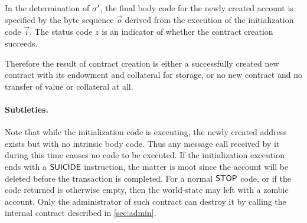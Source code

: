 In the determination of $\mathbf{\sigma}'$, the final body code for the newly created account is specified by the byte sequence $\vec{o}$ derived from the execution of the initialization code $\vec{i}$.
The status code $z$ is an indicator of whether the contract creation succeeds.

Therefore the result of contract creation is either a successfully created new contract with its endowment and collateral for storage, or no new contract and no transfer of value or collateral at all.

\paragraph{Subtleties.} 
Note that while the initialization code is executing, the newly created address exists but with no intrinsic body code. 
Thus any message call received by it during this time causes no code to be executed. 
If the initialization execution ends with a $\mathsf{SUICIDE}$ instruction, the matter is moot since the account will be deleted before the transaction is completed. 
For a normal $\mathsf{STOP}$ code, or if the code returned is otherwise empty, then the world-state may left with a zombie account. Only the administrator of such contract can destroy it by calling the internal contract described in \cref{sec:admin}.
